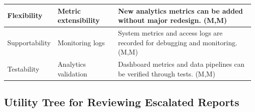 \documentclass{article}
\begin{document}
\begin{table}[H]
\begin{tabular}{|p{3cm}|p{4cm}|p{7cm}|}
Flexibility
& Metric extensibility
& New analytics metrics can be added without major redesign. (M,M) \\
\hline

Supportability
& Monitoring logs
& System metrics and access logs are recorded for debugging and monitoring. (M,M) \\
\hline

Testability
& Analytics validation
& Dashboard metrics and data pipelines can be verified through tests. (M,M) \\
\hline

\end{tabular}
\end{table}

\subsection{Utility Tree for Reviewing Escalated Reports}
\end{document}
